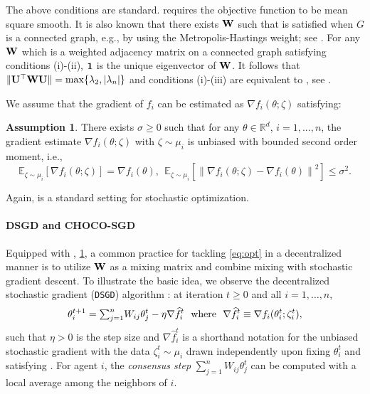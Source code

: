 \documentclass[10pt]{article} %
\newcommand{\revision}{}
\theoremstyle{plain}
\theoremstyle{definition}
\newtheorem{assumption}[theorem]{Assumption}
\theoremstyle{remark}
\newcommand{\norm}[1]{\left\| #1 \right\|}
\newcommand{\W}{{\bf W}}
\newcommand{\U}{{\bf U}}
\newcommand{\stocgrdf}{\nabla \widehat{f}}
\begin{document}
The above conditions are standard.  requires the objective function to be {\revision mean square} smooth.
It is also known that there exists $\W$ such that  is satisfied when $G$ is a connected graph, e.g., by using the Metropolis-Hastings weight; see \citep{boyd2004fastest}. 
{\revision For any ${\bf W}$ which is a weighted adjacency matrix on a connected graph satisfying conditions (i)-(ii), ${\bf 1}$ is the unique eigenvector of ${\bf W}$. It follows that $\| \U^\top \W \U \| = \max\{ \lambda_2, |\lambda_n| \}$ and conditions (i)-(iii) are equivalent to  \cite[Definition 1]{koloskova2019decentralized}, see .}

We assume that the gradient of $f_i$ can be estimated as $\nabla f_i( \theta; \zeta)$ satisfying:
\begin{assumption} \label{ass:stoc}
    There exists $\sigma \geq 0$ such that for any $\theta \in \mathbb{R}^d$, $i=1,...,n$, the gradient estimate $\nabla f_i( \theta; \zeta)$ with $\zeta \sim \mu_i$ is unbiased with bounded second order moment, i.e., 
    \begin{equation}
    \mathbb{E}_{\zeta \sim \mu_i} [ \nabla f_i( \theta; \zeta) ] = \nabla f_i(\theta),~~\mathbb{E}_{\zeta \sim \mu_i} [ \norm{ \nabla f_i( \theta; \zeta) - \nabla f_i( \theta) }^2 ] \leq \sigma^2.
    \end{equation}
\end{assumption} \vspace{-.2cm}
Again,  is a standard setting for stochastic optimization.

\paragraph{DSGD and CHOCO-SGD}
Equipped with , \ref{ass:stoc}, a common practice for tackling \eqref{eq:opt} in a decentralized manner is to utilize $\W$ as a mixing matrix and combine mixing with stochastic gradient descent. To illustrate the basic idea, we observe the decentralized stochastic gradient ({\tt DSGD}) algorithm \citep{ram2010distributed}: at iteration $t \geq 0$ and all $i=1,\ldots,n$,\vspace{-.1cm}
\begin{equation}
    \theta_i^{t+1} = {\textstyle \sum_{j=1}^n} W_{ij} \theta_j^t - \eta \stocgrdf_i^{t}~~\text{where}~~\stocgrdf_i^{t} \equiv \nabla f_i( \theta_i^{t}; \zeta_i^{t} ),\vspace{-.2cm} \label{eq:dgd}
\end{equation}
such that $\eta>0$ is the step size and $\stocgrdf_i^{t}$ is a shorthand notation for the unbiased stochastic gradient with the data $\zeta_i^{t} \sim \mu_i$ drawn independently upon fixing $\theta_i^t$ and satisfying .
For agent $i$, the \emph{consensus step} $\sum_{j=1}^n W_{ij} \theta_j^t$ can be computed with a local average among the neighbors of $i$. 
\end{document}
